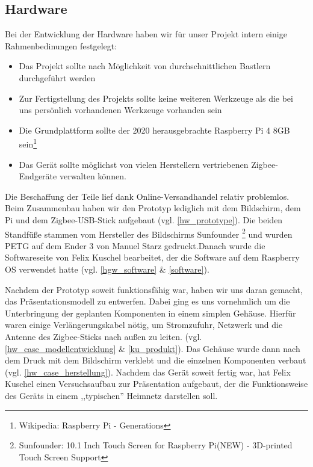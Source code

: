 \subsection{Hardware}\label{hgw_hardware}
Bei der Entwicklung der Hardware haben wir für unser Projekt intern einige Rahmenbedinungen festgelegt:
\begin{itemize}
	\item Das Projekt sollte nach Möglichkeit von durchschnittlichen Bastlern durchgeführt werden
	\item Zur Fertigstellung des Projekts sollte keine weiteren Werkzeuge als die bei uns persönlich vorhandenen Werkzeuge vorhanden sein
	\item Die Grundplattform sollte der 2020 herausgebrachte Raspberry Pi 4 8GB sein\footnote{Wikipedia: Raspberry Pi - Generations}
	\item Das Gerät sollte möglichst von vielen Herstellern vertriebenen Zigbee-Endgeräte verwalten können.
\end{itemize}
Die Beschaffung der Teile lief dank Online-Versandhandel relativ problemlos. Beim Zusammenbau haben wir den Prototyp lediglich mit dem Bildschirm, dem Pi und dem Zigbee-USB-Stick aufgebaut (vgl. \ref{hw_prototype}). Die beiden Standfüße stammen vom Hersteller des Bildschirms Sunfounder \footnote{Sunfounder: 10.1 Inch Touch Screen for Raspberry Pi(NEW) - 3D-printed Touch Screen Support} und wurden PETG auf dem Ender 3 von Manuel Starz gedruckt.Danach wurde die Softwareseite von Felix Kuschel bearbeitet, der die Software auf dem Raspberry OS verwendet hatte (vgl. \ref{hgw_software} \& \ref{software}).\par
Nachdem der Prototyp soweit funktionsfähig war, haben wir uns daran gemacht, das Präsentationsmodell zu entwerfen. Dabei ging es uns vornehmlich um die Unterbringung der geplanten Komponenten in einem simplen Gehäuse. Hierfür waren einige Verlängerungskabel nötig, um Stromzufuhr, Netzwerk und die Antenne des Zigbee-Sticks nach außen zu leiten. (vgl.\ref{hw_case_modellentwicklung} \& \ref{ku_produkt}). Das Gehäuse wurde dann nach dem Druck mit dem Bildschirm verklebt und die einzelnen Komponenten verbaut (vgl. \ref{hw_case_herstellung}). Nachdem das Gerät soweit fertig war, hat Felix Kuschel einen Versuchsaufbau zur Präsentation aufgebaut, der die Funktionsweise des Geräts in einem ,,typischen'' Heimnetz darstellen soll.